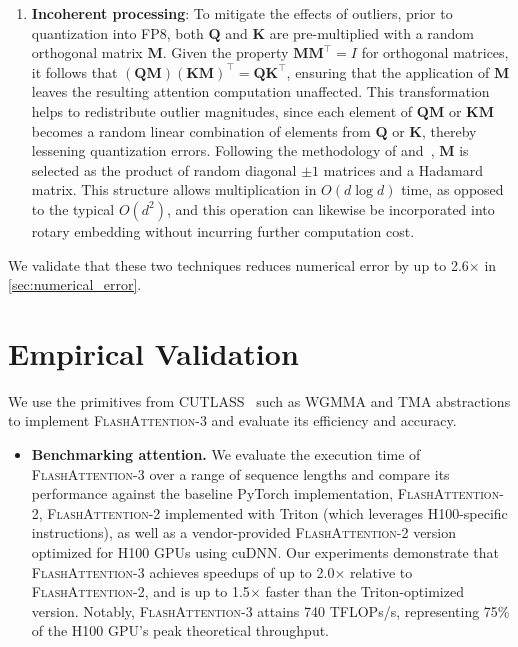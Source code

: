 \begin{enumerate}
\begin{algorithm}[H]
\begin{algorithmic}[1]
\begin{enumerate}
\item \textbf{Incoherent processing}: To mitigate the effects of outliers, prior to quantization into FP8, both $\mathbf{Q}$ and $\mathbf{K}$ are pre-multiplied with a random orthogonal matrix $\mathbf{M}$. Given the property $\mathbf{M} \mathbf{M}^\top = I$ for orthogonal matrices, it follows that $(\mathbf{Q} \mathbf{M}) (\mathbf{K} \mathbf{M})^\top = \mathbf{Q} \mathbf{K}^\top$, ensuring that the application of $\mathbf{M}$ leaves the resulting attention computation unaffected. This transformation helps to redistribute outlier magnitudes, since each element of $\mathbf{Q} \mathbf{M}$ or $\mathbf{K} \mathbf{M}$ becomes a random linear combination of elements from $\mathbf{Q}$ or $\mathbf{K}$, thereby lessening quantization errors. Following the methodology of \citet{chee2024quip} and~\citet{tseng2024quip}, $\mathbf{M}$ is selected as the product of random diagonal $\pm 1$ matrices and a Hadamard matrix. This structure allows multiplication in $O(d \log d)$ time, as opposed to the typical $O(d^2)$, and this operation can likewise be incorporated into rotary embedding without incurring further computation cost.
\end{enumerate}

We validate that these two techniques reduces numerical error by up to 2.6$\times$ in \cref{sec:numerical_error}.

\section{Empirical Validation}
\label{sec:exp}

We use the primitives from CUTLASS~\citep{Thakkar_CUTLASS_2023} such as WGMMA and TMA abstractions to implement \textsc{FlashAttention-3} and evaluate its efficiency and accuracy.

\begin{itemize}

\item \textbf{Benchmarking attention.} We evaluate the execution time of \textsc{FlashAttention-3} over a range of sequence lengths and compare its performance against the baseline PyTorch implementation, \textsc{FlashAttention-2}, \textsc{FlashAttention-2} implemented with Triton (which leverages H100-specific instructions), as well as a vendor-provided \textsc{FlashAttention-2} version optimized for H100 GPUs using cuDNN. Our experiments demonstrate that \textsc{FlashAttention-3} achieves speedups of up to 2.0$\times$ relative to \textsc{FlashAttention-2}, and is up to 1.5$\times$ faster than the Triton-optimized version. Notably, \textsc{FlashAttention-3} attains 740 TFLOPs/s, representing 75\% of the H100 GPU's peak theoretical throughput.


\end{itemize}
\end{algorithmic}
\end{algorithm}
\end{enumerate}
